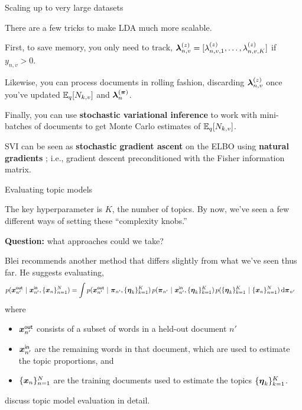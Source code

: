 \documentclass[aspectratio=169]{beamer}
\begin{document}
\begin{frame}{Scaling up to very large datasets}

There are a few tricks to make LDA much more scalable. 

First, to save memory, you only need to track, $\boldsymbol{\lambda}_{n,v}^{(z)} = [\lambda_{n,v,1}^{(z)}, \ldots, \lambda_{n,v,K}^{(z)}]$ if $y_{n,v} > 0$. 

Likewise, you can process documents in rolling fashion, discarding $\boldsymbol{\lambda}_{n,v}^{(z)}$ once you've updated $\mathbb{E}_q[N_{k,v}]$ and $\boldsymbol{\lambda}_n^{(\boldsymbol{\pi})}$. 

Finally, you can use \textbf{stochastic variational inference} \citep{hoffman2013stochastic} to work with mini-batches of documents to get Monte Carlo estimates of $\mathbb{E}_q[N_{k,v}]$. 

SVI can be seen as \textbf{stochastic gradient ascent} on the ELBO using \textbf{natural gradients} \citet{amari1998natural}; i.e., gradient descent preconditioned with the Fisher information matrix.

    
\end{frame}

\begin{frame}{Evaluating topic models}
    
The key hyperparameter is $K$, the number of topics. By now, we've seen a few different ways of setting these ``complexity knobs.'' 

\textbf{Question: } what approaches could we take?

Blei recommends another method that differs slightly from what we've seen thus far. He suggests evaluating,
\begin{align}
    p(\boldsymbol{x}_{n'}^{\mathsf{out}} ~\vert~ \boldsymbol{x}_{n'}^{\mathsf{in}}, \{\boldsymbol{x}_n\}_{n=1}^N) 
    &= \int p(\boldsymbol{x}_{n'}^{\mathsf{out}} ~\vert~ \boldsymbol{\pi}_{n'}, \{\boldsymbol{\eta}_k\}_{k=1}^K) \, p(\boldsymbol{\pi}_{n'} ~\vert~ \boldsymbol{x}_{n'}^{\mathsf{in}}, \{\boldsymbol{\eta}_k\}_{k=1}^K) \, p(\{\boldsymbol{\eta}_k\}_{k=1}^K ~\vert~ \{\boldsymbol{x}_n\}_{n=1}^N) \mathop{}\!\mathrm{d} \boldsymbol{\pi}_{n'}
\end{align}
where 
\begin{itemize}
    \item $\boldsymbol{x}_{n'}^{\mathsf{out}}$ consists of a subset of words in a held-out document $n'$
    \item $\boldsymbol{x}_{n'}^{\mathsf{in}}$ are the remaining words in that document, which are used to estimate the topic proportions, and
    \item $\{\boldsymbol{x}_n\}_{n=1}^N$ are the training documents used to estimate the topics $\{\boldsymbol{\eta}_k\}_{k=1}^K$.
\end{itemize}
\citet{wallach2009evaluation} discuss topic model evaluation in detail.
\end{frame}
\end{document}
